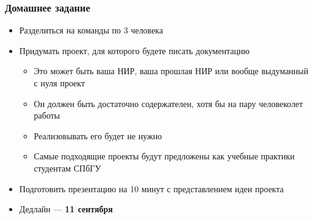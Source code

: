 \documentclass{../../slides-style}
\begin{document}
    \begin{frame}
        \frametitle{Домашнее задание}
        \begin{itemize}
            \item Разделиться на команды по 3 человека
            \item Придумать проект, для которого будете писать документацию
            \begin{itemize}
                \item Это может быть ваша НИР, ваша прошлая НИР или вообще выдуманный с нуля проект
                \item Он должен быть достаточно содержателен, хотя бы на пару человеколет работы
                \item Реализовывать его будет не нужно
                \item Самые подходящие проекты будут предложены как учебные практики студентам СПбГУ
            \end{itemize}
            \item Подготовить презентацию на 10 минут с представлением идеи проекта
            \item Дедлайн --- \textbf{11 сентября}
        \end{itemize}
    \end{frame}
\end{document}
